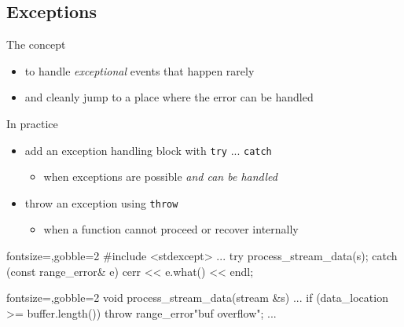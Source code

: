 \subsection[except]{Exceptions}

\begin{frame}[fragile]
  \begin{block}{The concept}
    \begin{itemize}
      \item to handle \textit{exceptional} events that happen rarely
      \item and cleanly jump to a place where the error can be handled
    \end{itemize}
  \end{block}
  \begin{block}{In practice}
    \begin{itemize}
      \item add an exception handling block with \texttt{try} ... \texttt{catch}
      \begin{itemize}
        \item when exceptions are possible \textit{and can be handled}
      \end{itemize}
      \item throw an exception using \texttt{throw}
      \begin{itemize}
        \item when a function cannot proceed or recover internally
      \end{itemize}
    \end{itemize}
  \end{block}
  \begin{multicols}{2}
    \begin{cppcode*}{fontsize=\scriptsize,gobble=2}
      #include <stdexcept>
      ...
      try {
        process_stream_data(s);
      } catch (const range_error& e) {
        cerr << e.what() << endl;
      }
    \end{cppcode*}
    \columnbreak
    \begin{cppcode*}{fontsize=\scriptsize,gobble=2}
      void process_stream_data(stream &s) {
        ...
        if (data_location >= buffer.length()) {
          throw range_error{"buf overflow"};
        }
        ...
      }
    \end{cppcode*}
  \end{multicols}
\end{frame}

